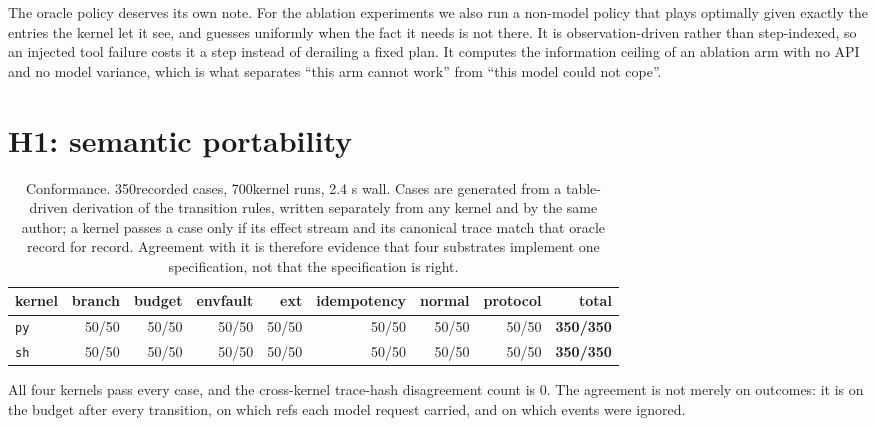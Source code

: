 \documentclass[11pt,a4paper]{article}
\begin{document}
The oracle policy deserves its own note. For the ablation experiments we also
run a non-model policy that plays optimally given exactly the entries the
kernel let it see, and guesses uniformly when the fact it needs is not there.
It is observation-driven rather than step-indexed, so an injected tool failure
costs it a step instead of derailing a fixed plan. It computes the information
ceiling of an ablation arm with no API and no model variance, which is what
separates ``this arm cannot work'' from ``this model could not cope''.

\section{H1: semantic portability}
\label{sec:h1}

\begin{table}[h]\centering\small
\caption{Conformance. 350recorded cases, 700kernel runs,
2.4 s wall. Cases are generated from a table-driven derivation of the
transition rules, written separately from any kernel and by the same author; a
kernel passes a case only if its effect stream and its canonical trace match
that oracle record for record. Agreement with it is therefore evidence that
four substrates implement one specification, not that the specification is
right.}
\label{tab:conformance}
\begin{tabular}{lrrrrrrrr}
\toprule
kernel & branch & budget & envfault & ext & idempotency & normal & protocol & total \\
\midrule
\texttt{py} & 50/50 & 50/50 & 50/50 & 50/50 & 50/50 & 50/50 & 50/50 & \textbf{350/350} \\
\texttt{sh} & 50/50 & 50/50 & 50/50 & 50/50 & 50/50 & 50/50 & 50/50 & \textbf{350/350} \\
\bottomrule
\end{tabular}
\end{table}

All four kernels pass every case, and the cross-kernel trace-hash disagreement
count is 0. The agreement is not merely on outcomes: it is on the
budget after every transition, on which refs each model request carried, and on
which events were ignored.
\end{document}
